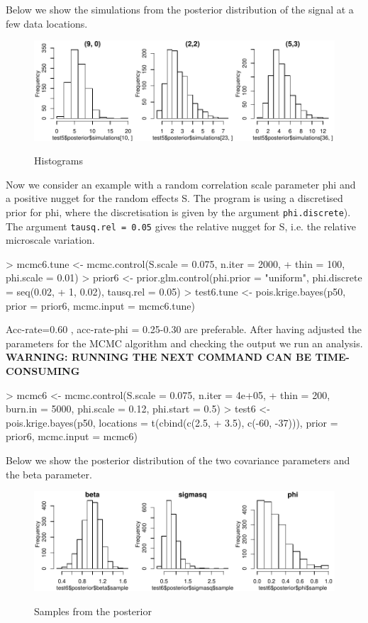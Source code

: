 \documentclass[12pt,a4paper]{article}
\newcommand{\strong}[1]{{\textbf{ #1}}}
\newcommand{\code}[1]{\texttt{\small #1}}
\begin{document}
Below we show the simulations from the posterior distribution of the signal at a few data locations.
\begin{figure}[h!]
\centering
\includegraphics{geoRglmintro-021}
\label{fig:hist.sim.bayes}
\caption{Histograms}
\end{figure}

Now we consider an example with a random correlation scale parameter phi and a positive nugget for the random effects S. The program is using a discretised prior for phi, where the discretisation is given by
the argument \code{phi.discrete}). The argument \code{tausq.rel = 0.05} gives the relative nugget for S, i.e. the relative 
microscale variation.
\begin{Schunk}
\begin{Sinput}
> mcmc6.tune <- mcmc.control(S.scale = 0.075, n.iter = 2000, 
+     thin = 100, phi.scale = 0.01)
> prior6 <- prior.glm.control(phi.prior = "uniform", phi.discrete = seq(0.02, 
+     1, 0.02), tausq.rel = 0.05)
> test6.tune <- pois.krige.bayes(p50, prior = prior6, mcmc.input = mcmc6.tune)
\end{Sinput}
\end{Schunk}

Acc-rate=0.60 , acc-rate-phi = 0.25-0.30  are preferable. 
After having adjusted the parameters for the MCMC algorithm and checking the output we run an analysis.\\
\strong{WARNING: RUNNING THE NEXT COMMAND CAN BE TIME-CONSUMING}
\begin{Schunk}
\begin{Sinput}
> mcmc6 <- mcmc.control(S.scale = 0.075, n.iter = 4e+05, 
+     thin = 200, burn.in = 5000, phi.scale = 0.12, phi.start = 0.5)
> test6 <- pois.krige.bayes(p50, locations = t(cbind(c(2.5, 
+     3.5), c(-60, -37))), prior = prior6, mcmc.input = mcmc6)
\end{Sinput}
\end{Schunk}

Below we show the posterior distribution of the two covariance parameters and the beta parameter.
\begin{figure}[h!]
\centering
\includegraphics{geoRglmintro-024}
\label{fig:posterior}
\caption{Samples from the posterior}
\end{figure}
\end{document}
